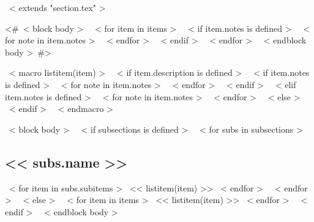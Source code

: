 ~< extends "section.tex" >~

<#~< block body >~
  ~< for item in items >~
    ~< if item.notes is defined >~
      ~< for note in item.notes >~
      ~< endfor >~
    ~< endif >~
  ~< endfor >~
~< endblock body >~#>

~< macro listitem(item) >~
  ~< if item.description is defined >~
    ~< if item.notes is defined >~
      ~< for note in item.notes >~
      ~< endfor >~
    ~< endif >~
  ~< elif item.notes is defined >~
    ~< for note in item.notes >~
    ~< endfor >~
  ~< else >~
  ~< endif >~
~< endmacro >~

~< block body >~
  ~< if subsections is defined >~
    ~< for subs in subsections >~
      \subsection{<< subs.name >>}
        ~< for item in subs.subitems >~
          << listitem(item) >>
        ~< endfor >~
    ~< endfor >~
  ~< else >~
    ~< for item in items >~
      << listitem(item) >>
    ~< endfor >~
  ~< endif >~
~< endblock body >~

